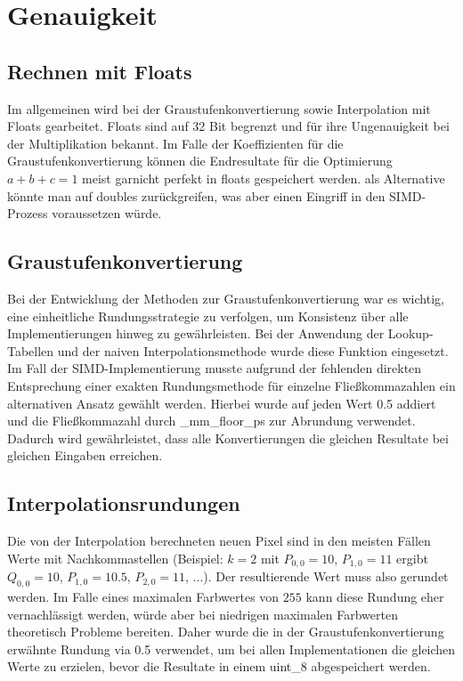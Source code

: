 \documentclass[course=erap]{aspdoc}
\begin{document}
\section{Genauigkeit}
\subsection{Rechnen mit Floats}
Im allgemeinen wird bei der Graustufenkonvertierung sowie Interpolation mit Floats gearbeitet. Floats sind auf 32 Bit begrenzt und für ihre Ungenauigkeit bei der Multiplikation bekannt. Im Falle der Koeffizienten für die Graustufenkonvertierung können die Endresultate für die Optimierung $a + b + c = 1$ meist garnicht perfekt in floats gespeichert werden. als Alternative könnte man auf doubles zurückgreifen, was aber einen Eingriff in den SIMD-Prozess voraussetzen würde.


\subsection{Graustufenkonvertierung}
Bei der Entwicklung der Methoden zur Graustufenkonvertierung war es wichtig, eine einheitliche Rundungsstrategie zu verfolgen, um Konsistenz über alle Implementierungen hinweg zu gewährleisten. Bei der Anwendung der Lookup-Tabellen und der naiven Interpolationsmethode wurde diese Funktion eingesetzt.\\
Im Fall der SIMD-Implementierung musste aufgrund der fehlenden direkten Entsprechung einer exakten Rundungsmethode für einzelne Fließkommazahlen ein alternativen Ansatz gewählt werden. Hierbei wurde auf jeden Wert 0.5 addiert und die Fließkommazahl durch \_mm\_floor\_ps zur Abrundung verwendet. Dadurch wird gewährleistet, dass alle Konvertierungen die gleichen Resultate bei gleichen Eingaben erreichen.

\subsection{Interpolationsrundungen}
Die von der Interpolation berechneten neuen Pixel sind in den meisten Fällen Werte mit Nachkommastellen (Beispiel: $k = 2$ mit $P_{0,0} = 10$, $P_{1,0} = 11$ ergibt $Q_{0,0} = 10$, $P_{1,0} = 10.5$, $P_{2,0} = 11$, $...$). Der resultierende Wert muss also gerundet werden. Im Falle eines maximalen Farbwertes von $255$ kann diese Rundung eher vernachlässigt werden, würde aber bei niedrigen maximalen Farbwerten theoretisch Probleme bereiten. Daher wurde die in der Graustufenkonvertierung erwähnte Rundung via 0.5 verwendet, um bei allen Implementationen die gleichen Werte zu erzielen, bevor die Resultate in einem uint\_8 abgespeichert werden.
\end{document}
